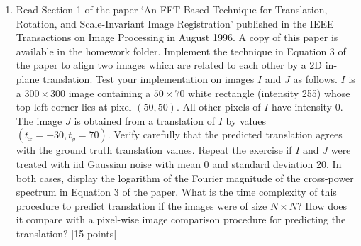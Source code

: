 \documentclass[11pt]{article}
\begin{document}
\begin{enumerate}
\item Read Section 1 of the paper `An FFT-Based Technique for Translation, Rotation, and Scale-Invariant Image Registration' published in the IEEE Transactions on Image Processing in August 1996. A copy of this paper is available in the homework folder. Implement the technique in Equation 3 of the paper to align two images which are related to each other by a 2D in-plane translation. Test your implementation on images $I$ and $J$ as follows. $I$ is a $300 \times 300$ image containing a $50 \times 70$ white rectangle (intensity 255) whose top-left corner lies at pixel $(50,50)$. All other pixels of $I$ have intensity 0. The image $J$ is obtained from a translation of $I$ by values $(t_x=-30,t_y=70)$. Verify carefully that the predicted translation agrees with the ground truth translation values. Repeat the exercise if $I$ and $J$ were treated with iid Gaussian noise with mean 0 and standard deviation 20. In both cases, display the logarithm of the Fourier magnitude of the cross-power spectrum in Equation 3 of the paper. What is the time complexity of this procedure to predict translation if the images were of size $N \times N$? How does it compare with a pixel-wise image comparison procedure for predicting the translation? \textsf{[15 points]}

\end{enumerate}
\end{document}
